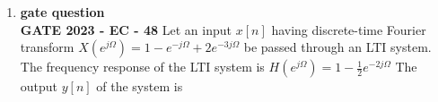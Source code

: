 \documentclass{article}
\begin{document}
\begin{enumerate}
\item \textbf{gate question}\\

\textbf{GATE 2023 - EC - 48}
Let an input \( x[n] \) having discrete-time Fourier transform
$X(e^{j\Omega}) = 1 - e^{-j\Omega} + 2e^{-3j\Omega}$
be passed through an LTI system. The frequency response of the LTI system is 
$H(e^{j\Omega}) = 1 - \frac{1}{2} e^{-2j\Omega}$
The output $y[n]$ of the system is \\


\end{enumerate}
\end{document}
